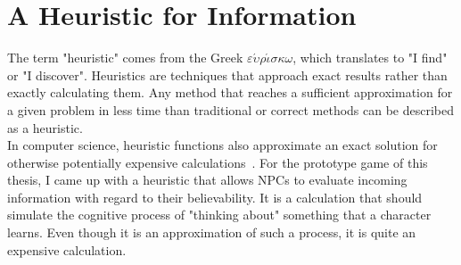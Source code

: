 \section{A Heuristic for Information}
The term "heuristic" comes from the Greek $\varepsilon\acute{\upsilon}\rho\acute{\iota}\sigma\kappa\omega$, which translates to "I find" or "I discover". Heuristics are techniques that approach exact results rather than exactly calculating them. Any method that reaches a sufficient approximation for a given problem in less time than traditional or correct methods can be described as a heuristic.~\cite{Ippoliti2015}\\
In computer science, heuristic functions also approximate an exact solution for otherwise potentially expensive calculations~\cite{Pearl1984}. For the prototype game of this thesis, I came up with a heuristic that allows NPCs to evaluate incoming information with regard to their believability. It is a calculation that should simulate the cognitive process of "thinking about" something that a character learns. Even though it is an approximation of such a process, it is quite an expensive calculation. 
